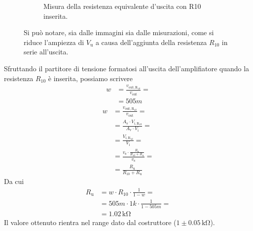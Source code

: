 \documentclass[a4paper]{article}
\begin{document}
\begin{figure}[h!]
\begin{subfigure}{0.4\textwidth}
						\caption{Misura della resistenza equivalente d'uscita con R10 inserita.}
					\end{subfigure}
					\label{fig:misuraDellaResistenzaEquivalenteDiUscitaAmplificatoreNonInvertente}
					\caption{Si può notare, sia dalle immagini sia dalle misurazioni, come si riduce l'ampiezza di $ V_{\mathrm{u}} $ a causa dell'aggiunta della resistenza $ R_{10} $ in serie all'uscita.}
				\end{figure}
				\newline
				Sfruttando il partitore di tensione formatosi all'uscita dell'amplifiatore quando la resistenza $ R_{10} $ è inserita, possiamo scrivere
				\begin{equation*}
					\begin{split}
						w &= \frac{v_{\mathrm{out,R_{10}}}}{v_{\mathrm{out}}} = \\
						  &= 505m
					\end{split}
				\end{equation*}
				\begin{equation*}
					\begin{split}
						w &= \frac{v_{\mathrm{out,R_{10}}}}{v_{\mathrm{out}}} = \\
						  &= \frac{A_{\mathrm{v}} \cdot V_{\mathrm{i,R_{10}}}}{A_{\mathrm{v}} \cdot V_{\mathrm{i}}} = \\
						  &= \frac{V_{\mathrm{i,R_{10}}}}{V_{\mathrm{i}}} = \\
						  &= \frac{v_{\mathrm{s}} \cdot \frac{R_{\mathrm{u}}}{R_{10} + R_{\mathrm{u}}}}{v_{\mathrm{s}}} = \\
						  &= \frac{R_{\mathrm{u}}}{R_{10} + R_{\mathrm{u}}}
					\end{split}
				\end{equation*}
				Da cui
				\begin{equation*}
					\begin{split}
						R_{\mathrm{u}} &= w \cdot R_{10} \cdot \frac{1}{1 - w} = \\
									   &= 505m \cdot 1k \cdot \frac{1}{1 - 505m} = \\
									   &= 1.02 \, \mathrm{k\Omega}
					\end{split}
				\end{equation*}
				Il valore ottenuto rientra nel range dato dal costruttore ($ 1 \pm 0.05 \, \mathrm{k\Omega} $).
\end{document}

